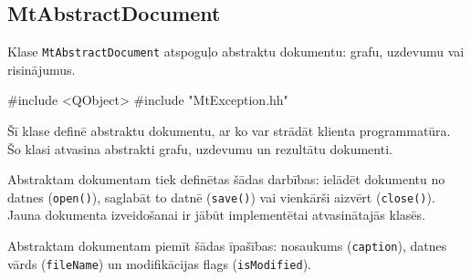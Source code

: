 \subsection{MtAbstractDocument}
Klase \verb|MtAbstractDocument| atspoguļo abstraktu dokumentu: grafu, uzdevumu
vai risinājumus.
\begin{includes}
#include <QObject>
#include "MtException.hh"
\end{includes}

\publicmethods
\begin{memblist}
\end{memblist}

\protectedmethods
\begin{memblist}
\end{memblist}

\signals
\begin{memblist}
\end{memblist}

\classdescription
Šī klase definē abstraktu dokumentu, ar ko var strādāt klienta programmatūra.
Šo klasi atvasina abstrakti grafu, uzdevumu un rezultātu dokumenti.

Abstraktam dokumentam tiek definētas šādas darbības: ielādēt dokumentu no datnes
(\verb|open()|), saglabāt to datnē (\verb|save()|) vai vienkārši aizvērt (\verb|close()|).
Jauna dokumenta izveidošanai ir jābūt implementētai atvasinātajās klasēs.

Abstraktam dokumentam piemīt šādas īpašības: nosaukums (\verb|caption|),
datnes vārds (\verb|fileName|) un modifikācijas flags (\verb|isModified|).

\methoddescription

